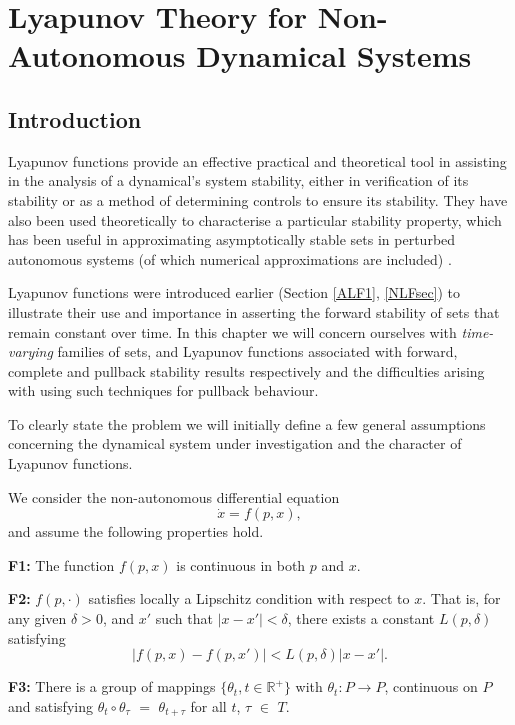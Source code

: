 
\chapter[Lyapunov Theory]{Lyapunov Theory for Non-Autonomous
         Dynamical Systems} \label{Lyapchapter}

\section{Introduction}

Lyapunov functions provide an effective practical and theoretical tool in
assisting in the analysis of a dynamical's system stability, either in
verification of its stability or as a method of determining controls to ensure
its stability. They have also been used theoretically to
characterise a particular stability property, which has been useful in
approximating asymptotically stable sets in perturbed autonomous systems (of
which numerical approximations are included) \cite{St94}.

Lyapunov functions were introduced earlier (Section \ref{ALF1}, \ref{NLFsec})
to illustrate their use and importance in asserting the forward stability of
sets that remain constant over time. In this chapter we will concern ourselves
with \textit{time-varying} families of sets, and Lyapunov functions associated with
forward, complete and pullback stability results respectively and the
difficulties arising with using such techniques for pullback behaviour.

To clearly state the problem we will initially define a few general assumptions
concerning the dynamical system under investigation and the character of
Lyapunov functions.

We consider the non-autonomous differential equation
\begin{equation}
\label{NDEeq}
\dot{x} = f(p, x ),
\end{equation}
and assume the following properties hold.

{\bf F1:} The function $f(p, x)$ is continuous in both $p$ and $x$.

{\bf F2:} $f(p, \cdot)$ satisfies locally a Lipschitz condition with respect to
$x$. That is, for any given $\delta > 0$, and $x'$ such that $|x - x'| <
\delta$, there exists a constant $L(p, \delta)$ satisfying
\[ |f(p, x) - f(p, x')| < L(p, \delta)|x - x'|. \]

{\bf F3:} There is a group of mappings $\{\theta_t, t \in
\mathbb{R}^+ \}$ with $\theta_t : P \to P$, continuous on $P$ and satisfying
$\theta_{t} \circ \theta_{\tau}$ $=$ $\theta_{t+\tau}$ for all $t$, $\tau$
$\in$ $T$.

